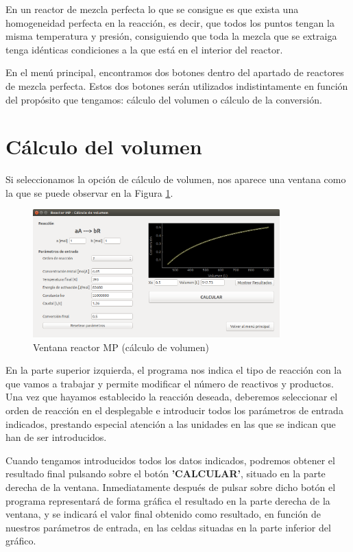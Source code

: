 En un reactor de mezcla perfecta lo  que  se  consigue  es  que  exista  una  homogeneidad 
perfecta en la reacción, es decir, que todos los puntos tengan la misma temperatura y presión, 
consiguiendo que toda la mezcla que se extraiga tenga idénticas condiciones a la que 
está en el interior del reactor.
	
	En el menú principal, encontramos dos botones dentro del apartado de reactores de mezcla perfecta. Estos dos botones serán utilizados indistintamente en función del propósito que tengamos: cálculo del volumen o cálculo de la conversión.
	
\section{Cálculo del volumen}
Si seleccionamos la opción de cálculo de volumen, nos aparece una ventana como la que se puede observar en la Figura \ref{fig:ventana_volumen}.

\begin{figure}[h!]
	\begin{center}
		\includegraphics[width=0.85\textwidth]{./imagenes/reactor_fp/mezcla_perfecta1.png}\caption{Ventana reactor MP (cálculo de volumen)}\label{fig:ventana_volumen}
	\end{center}
\end{figure}

En la parte superior izquierda, el programa nos indica el tipo de reacción con la que vamos a trabajar y permite modificar el número de reactivos y productos. Una vez que hayamos establecido la reacción deseada, deberemos seleccionar el orden de reacción en el desplegable e introducir todos los parámetros de entrada indicados, prestando especial atención a las unidades en las que se indican que han de ser introducidos.

Cuando tengamos introducidos todos los datos indicados, podremos obtener el resultado final pulsando sobre el botón \textbf{'CALCULAR'}, situado en la parte derecha de la ventana. Inmediatamente después de pulsar sobre dicho botón el programa representará de forma gráfica el resultado en la parte derecha de la ventana, y se indicará el valor final obtenido como resultado, en función de nuestros parámetros de entrada, en las celdas situadas en la parte inferior del gráfico.


